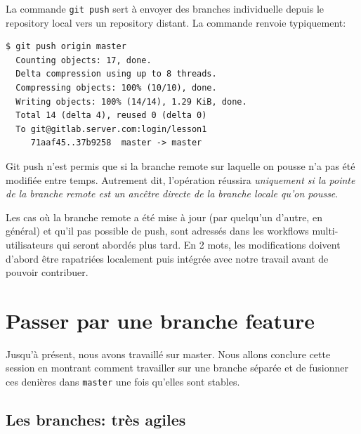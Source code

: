 \documentclass{../../common/tufte-latex/tufte-handout}
\begin{document}
La commande \texttt{git push} sert à envoyer des branches individuelle depuis le repository local vers un repository distant.
La commande renvoie typiquement:

\begin{lstlisting}[style=BashInputStyle]
  $ git push origin master 
  Counting objects: 17, done.
  Delta compression using up to 8 threads.
  Compressing objects: 100% (10/10), done.
  Writing objects: 100% (14/14), 1.29 KiB, done.
  Total 14 (delta 4), reused 0 (delta 0)
  To git@gitlab.server.com:login/lesson1
     71aaf45..37b9258  master -> master
\end{lstlisting}

Git push n'est permis que si la branche remote sur laquelle on pousse n'a pas été modifiée entre temps.
Autrement dit, l'opération réussira \textit{uniquement si la pointe de la branche remote est un ancêtre directe de la branche locale qu'on pousse}.

Les cas où la branche remote a été mise à jour (par quelqu'un d'autre, en général) et qu'il pas possible de push, sont adressés dans les workflows multi-utilisateurs qui seront abordés plus tard.
En 2 mots, les modifications doivent d'abord être rapatriées localement puis intégrée avec notre travail avant de pouvoir contribuer.

\section{Passer par une branche feature}

Jusqu'à présent, nous avons travaillé sur master.
Nous allons conclure cette session en montrant comment travailler sur une branche séparée et de fusionner ces denières dans \texttt{master} une fois qu'elles sont stables.

\subsection{Les branches: très agiles}
\end{document}

